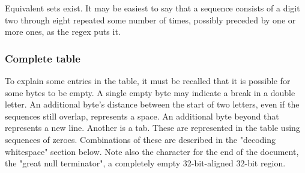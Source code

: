 \documentclass{article}
\begin{document}
Equivalent sets exist.  It may be easiest to say that a sequence consists of a digit two through eight repeated some number of times, possibly preceded by one or more ones, as the regex puts it.

\subsubsection{Complete table}
To explain some entries in the table, it must be recalled that it is possible for some bytes to be empty.  A single empty byte may indicate a break in a double letter.  An additional byte's distance between the start of two letters, even if the sequences still overlap, represents a space.  An additional byte beyond that represents a new line.  Another is a tab.  These are represented in the table using sequences of zeroes.
Combinations of these are described in the "decoding whitespace" section below.  Note also the character for the end of the document, the "great null terminator", a completely empty 32-bit-aligned 32-bit region.
\end{document}
